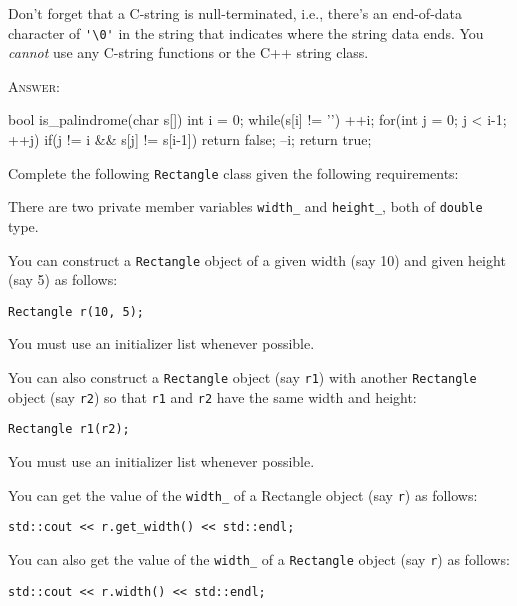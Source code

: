 Don’t forget that a C-string is null-terminated, i.e.,
there’s an end-of-data character of \verb!'\0'! in the string that indicates
where the string data ends.
You \textit{cannot} use any C-string functions or the C++ string class.

\textsc{Answer:}
\begin{answercode}
bool is_palindrome(char s[])
{
    int i = 0;
    while(s[i] != '\0')
        ++i;
    for(int j = 0; j < i-1; ++j)
    {
        if(j != i && s[j] != s[i-1])
            return false;
        --i;
    }
    return true;
}
\end{answercode}


\newpage
\nextq
Complete the following \verb!Rectangle! class given the following requirements:
\begin{enumerate}[nosep]

\li There are two private member variables \verb!width_! and \verb!height_!,
    both of \verb!double! type.

\li You can construct a \verb!Rectangle! object of a given width (say 10) and
    given height (say 5) as follows:
    \begin{Verbatim}[frame=single,fontsize=\small]
Rectangle r(10, 5);
    \end{Verbatim}
You must use an initializer list whenever possible.

\li You can also construct a \verb!Rectangle! object (say \verb!r1!) with
    another \verb!Rectangle! object (say \verb!r2!) so that
    \verb!r1! and \verb!r2! have the same width and height:
    \begin{Verbatim}[frame=single,fontsize=\small]
Rectangle r1(r2);
    \end{Verbatim}
    You must use an initializer list whenever possible.

\li You can get the value of the \verb!width_! of a Rectangle object
    (say \verb!r!) as follows:
    \begin{Verbatim}[frame=single,fontsize=\small]
std::cout << r.get_width() << std::endl;
    \end{Verbatim}

\li You can also get the value of the \verb!width_! of a
    \verb!Rectangle! object (say \verb!r!) as follows:
    \begin{Verbatim}[frame=single,fontsize=\small]
std::cout << r.width() << std::endl;
    \end{Verbatim}


\end{enumerate}
